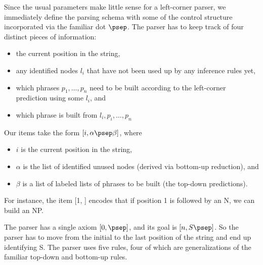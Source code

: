 Since the usual parameters make little sense for a left-corner parser, we immediately define the parsing schema with some of the control structure incorporated via the familiar dot $\psep$.
The parser has to keep track of four distinct pieces of information:
%
\begin{itemize}
    \item the current position in the string,
    \item any identified nodes $l_i$ that have not been used up by any inference rules yet,
    \item which phrases $p_1, \ldots, p_n$ need to be built according to the left-corner prediction using some $l_i$, and
    \item which phrase is built from $l_i, p_i, \ldots, p_n$
\end{itemize}
%
Our items take the form $[i, \alpha \psep \beta]$, where
%
\begin{itemize}
    \item $i$ is the current position in the string,
    \item $\alpha$ is the list of identified unused nodes (derived via bottom-up reduction), and
    \item $\beta$ is a list of labeled lists of phrases to be built (the top-down predictions).
\end{itemize}
%
For instance, the item [1, \psep [\tsb{NP} N]] encodes that if position 1 is followed by an N, we can build an NP\@.

The parser has a single axiom $[0,\psep]$, and its goal is $[n, S \psep]$.
So the parser has to move from the initial to the last position of the string and end up identifying S\@.
The parser uses five rules, four of which are generalizations of the familiar top-down and bottom-up rules.

\begin{prooftree}
\end{prooftree}

\begin{prooftree}
\end{prooftree}

\begin{prooftree}
\end{prooftree}

